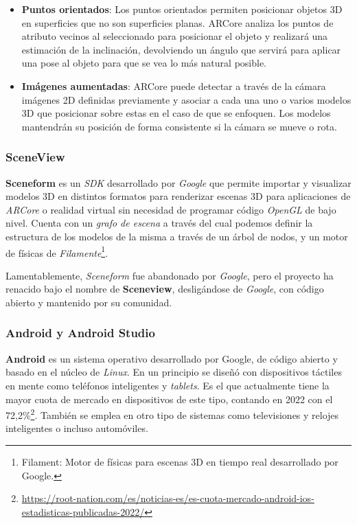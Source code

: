 \begin{itemize}
    \item \textbf{Puntos orientados}: Los puntos orientados permiten posicionar objetos 3D en superficies que no son superficies planas. ARCore analiza los puntos de atributo vecinos al seleccionado para posicionar el objeto y realizará una estimación de la inclinación, devolviendo un ángulo que servirá para aplicar una pose al objeto para que se vea lo más natural posible.

    \item \textbf{Imágenes aumentadas}: ARCore puede detectar a través de la cámara imágenes 2D definidas previamente y asociar a cada una uno o varios modelos 3D que posicionar sobre estas en el caso de que se enfoquen. Los modelos mantendrán su posición de forma consistente si la cámara se mueve o rota.

\end{itemize}

\subsubsection*{SceneView}

\textbf{Sceneform} es un \textit{SDK} desarrollado por \textit{Google} que permite importar y visualizar modelos 3D en distintos formatos para renderizar escenas 3D para aplicaciones de \textit{ARCore} o realidad virtual sin necesidad de programar código \textit{OpenGL} de bajo nivel. Cuenta con un \textit{grafo de escena} a través del cual podemos definir la estructura de los modelos de la misma a través de un árbol de nodos, y un motor de físicas de \textit{Filamente}\footnote{Filament: Motor de físicas para escenas 3D en tiempo real desarrollado por Google.}.

Lamentablemente, \textit{Sceneform} fue abandonado por \textit{Google}, pero el proyecto ha renacido bajo el nombre de \textbf{Sceneview}\cite{sceneview}, desligándose de \textit{Google}, con código abierto y mantenido por su comunidad.

\subsubsection*{Android y Android Studio}

\textbf{Android} es un sistema operativo desarrollado por Google, de código abierto y basado en el núcleo de \textit{Linux}. En un principio se diseñó con dispositivos táctiles en mente como teléfonos inteligentes y \textit{tablets}. Es el que actualmente tiene la mayor cuota de mercado en dispositivos de este tipo, contando en 2022 con el 72,2\%\footnote{\url{https://root-nation.com/es/noticias-es/es-cuota-mercado-android-ios-estadisticas-publicadas-2022/}}. También se emplea en otro tipo de sistemas como televisiones y relojes inteligentes o incluso automóviles.

